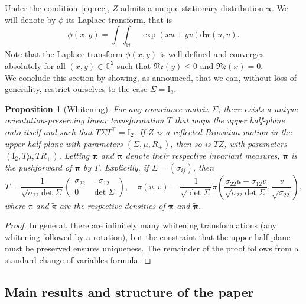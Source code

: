 \documentclass{article}
\theoremstyle{plain}
\newtheorem{proposition}[theorem]{Proposition}
\theoremstyle{definition}
\theoremstyle{remark}
\begin{document}
Under the condition~\eqref{eq:rec}, $Z$ admits a unique stationary distribution $\boldsymbol{\pi}$. We will denote by $\phi$ its Laplace transform, that is
$$\phi(x,y)=\int\!\!\!\!\int_{\mathbb H_+}\exp(xu+yv)\mathrm{d}\boldsymbol{\pi}(u,v).$$
Note that the Laplace transform $\phi(x,y)$ is well-defined and converges absolutely for all $(x,y)\in\mathbb C^2$ such that $\mathfrak{Re}(y)\leqslant 0$ and $\mathfrak{Re}(x)=0$.\\

We conclude this section by showing, as announced, that we can, without loss of generality, restrict ourselves to the case $\Sigma=\mathrm{I}_2$.

\begin{proposition}[Whitening]\label{prop:whitening}
    For any covariance matrix $\Sigma$, there exists a unique orientation-preserving linear transformation $T$ that maps the upper half-plane onto itself and such that $T\Sigma T^\intercal=\mathrm{I}_2$. If $Z$ is a reflected Brownian motion in the upper half-plane with parameters $(\Sigma,\mu,R_\pm)$, then so is $TZ$, with parameters $(\mathrm{I}_2,T\mu,TR_\pm)$. Letting $\boldsymbol{\pi}$ and $\widetilde{\boldsymbol{\pi}}$ denote their respective invariant measures, $\widetilde{\boldsymbol{\pi}}$ is the \textit{pushforward} of $\boldsymbol{\pi}$ by $T$. Explicitly, if $\Sigma=(\sigma_{ij})$, then 
$$T=\frac{1}{\sqrt{\sigma_{22}\det\Sigma}}\left(\begin{array}{cc}
        \sigma_{22} &  -\sigma_{12} \\
         0& \det\Sigma
    \end{array}\right),\quad \pi(u,v)=\frac{1}{\sqrt{\det\Sigma}}\widetilde{\pi}\left(\frac{\sigma_{22}u-\sigma_{12}v}{\sqrt{\sigma_{22}\det\Sigma}},\frac{v}{\sqrt{\sigma_{22}}}\right),$$
where $\pi$ and $\widetilde{\pi}$ are the respective densities of $\boldsymbol{\pi}$ and $\widetilde{\boldsymbol{\pi}}$.
\end{proposition}

\begin{proof}    
In general, there are infinitely many whitening transformations (any whitening followed by a rotation), but the constraint that the upper half-plane must be preserved ensures uniqueness. The remainder of the proof follows from a standard change of variables formula.
\end{proof}

\subsection*{Main results and structure of the paper}
\end{document}
